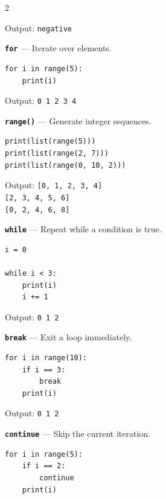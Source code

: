 \documentclass[10pt,a4paper]{article}
\begin{document}
\begin{multicols}{2}
\begin{card}
Output:
\texttt{negative}
\end{card}

\begin{card}
\textbf{\texttt{for}} --- Iterate over elements.

\begin{lstlisting}[style=pythonstyle]
for i in range(5):
    print(i)
\end{lstlisting}

Output:
\texttt{0 1 2 3 4}
\end{card}

\begin{card}
\textbf{\texttt{range()}} --- Generate integer sequences.

\begin{lstlisting}[style=pythonstyle]
print(list(range(5)))
print(list(range(2, 7)))
print(list(range(0, 10, 2)))
\end{lstlisting}

Output:
\texttt{[0, 1, 2, 3, 4]}\\
\texttt{[2, 3, 4, 5, 6]}\\
\texttt{[0, 2, 4, 6, 8]}
\end{card}

\begin{card}
\textbf{\texttt{while}} --- Repeat while a condition is true.

\begin{lstlisting}[style=pythonstyle]
i = 0

while i < 3:
    print(i)
    i += 1
\end{lstlisting}

Output:
\texttt{0 1 2}
\end{card}

\begin{card}
\textbf{\texttt{break}} --- Exit a loop immediately.

\begin{lstlisting}[style=pythonstyle]
for i in range(10):
    if i == 3:
        break
    print(i)
\end{lstlisting}

Output:
\texttt{0 1 2}
\end{card}

\begin{card}
\textbf{\texttt{continue}} --- Skip the current iteration.

\begin{lstlisting}[style=pythonstyle]
for i in range(5):
    if i == 2:
        continue
    print(i)
\end{lstlisting}


\end{card}
\end{multicols}
\end{document}
